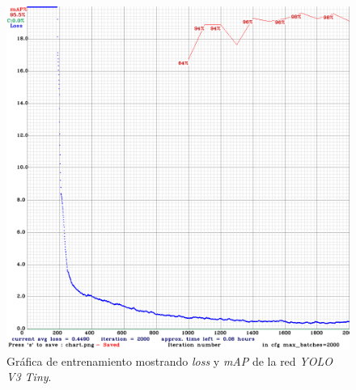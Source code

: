 \begin{figure} [h!]
	\begin{center}
		\includegraphics[width=12cm]{figs/chart}
	\end{center}
	\caption{Gráfica de entrenamiento mostrando \textit{loss} y \textit{mAP} de la red \textit{YOLO V3 Tiny}.}
	\label{fig:chart}
\end{figure}\

